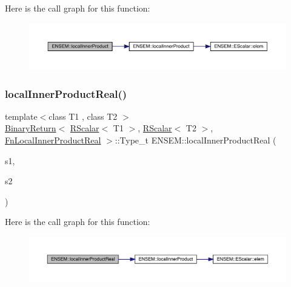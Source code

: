 Here is the call graph for this function\+:\nopagebreak
\begin{figure}[H]
\begin{center}
\leavevmode
\includegraphics[width=350pt]{d9/ded/group__rscalar_gadd76bb3801e8a4665498325bf9c7f6ae_cgraph}
\end{center}
\end{figure}
\mbox{\label{group__rscalar_gafd6d5a4377919b182f234ffe0eea09b4}} 
\subsubsection{\texorpdfstring{localInnerProductReal()}{localInnerProductReal()}}
{\footnotesize\ttfamily template$<$class T1 , class T2 $>$ \\
\mbox{\hyperlink{structENSEM_1_1BinaryReturn}{Binary\+Return}}$<$ \mbox{\hyperlink{classENSEM_1_1RScalar}{R\+Scalar}}$<$ T1 $>$, \mbox{\hyperlink{classENSEM_1_1RScalar}{R\+Scalar}}$<$ T2 $>$, \mbox{\hyperlink{structENSEM_1_1FnLocalInnerProductReal}{Fn\+Local\+Inner\+Product\+Real}} $>$\+::Type\+\_\+t E\+N\+S\+E\+M\+::local\+Inner\+Product\+Real (\begin{DoxyParamCaption}\item[{const \mbox{\hyperlink{classENSEM_1_1RScalar}{R\+Scalar}}$<$ T1 $>$ \&}]{s1,  }\item[{const \mbox{\hyperlink{classENSEM_1_1RScalar}{R\+Scalar}}$<$ T2 $>$ \&}]{s2 }\end{DoxyParamCaption})\hspace{0.3cm}{\ttfamily [inline]}}

Here is the call graph for this function\+:\nopagebreak
\begin{figure}[H]
\begin{center}
\leavevmode
\includegraphics[width=350pt]{d9/ded/group__rscalar_gafd6d5a4377919b182f234ffe0eea09b4_cgraph}
\end{center}
\end{figure}
\mbox{\label{group__rscalar_ga3ca325ab0808bb3c4b966320b923c213}} 
